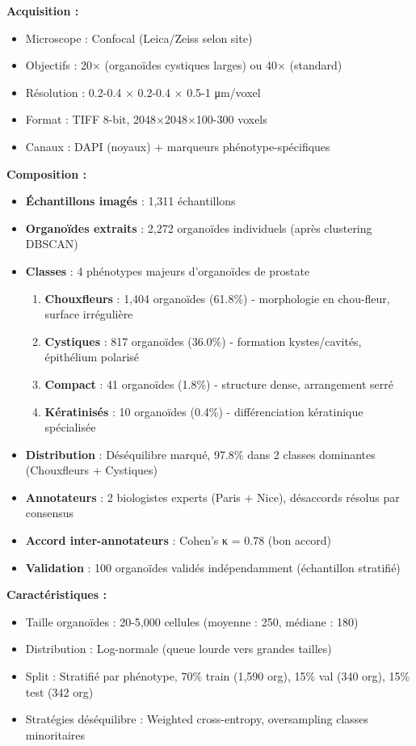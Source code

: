\textbf{Acquisition :}
\begin{itemize}
    \item Microscope : Confocal (Leica/Zeiss selon site)
    \item Objectifs : 20× (organoïdes cystiques larges) ou 40× (standard)
    \item Résolution : 0.2-0.4 × 0.2-0.4 × 0.5-1 μm/voxel
    \item Format : TIFF 8-bit, 2048×2048×100-300 voxels
    \item Canaux : DAPI (noyaux) + marqueurs phénotype-spécifiques
\end{itemize}

\textbf{Composition :}
\begin{itemize}
    \item \textbf{Échantillons imagés} : 1,311 échantillons
    \item \textbf{Organoïdes extraits} : 2,272 organoïdes individuels (après clustering DBSCAN)
    \item \textbf{Classes} : 4 phénotypes majeurs d'organoïdes de prostate
    \begin{enumerate}
        \item \textbf{Chouxfleurs} : 1,404 organoïdes (61.8\%) - morphologie en chou-fleur, surface irrégulière
        \item \textbf{Cystiques} : 817 organoïdes (36.0\%) - formation kystes/cavités, épithélium polarisé
        \item \textbf{Compact} : 41 organoïdes (1.8\%) - structure dense, arrangement serré
        \item \textbf{Kératinisés} : 10 organoïdes (0.4\%) - différenciation kératinique spécialisée
    \end{enumerate}
    \item \textbf{Distribution} : Déséquilibre marqué, 97.8\% dans 2 classes dominantes (Chouxfleurs + Cystiques)
    \item \textbf{Annotateurs} : 2 biologistes experts (Paris + Nice), désaccords résolus par consensus
    \item \textbf{Accord inter-annotateurs} : Cohen's κ = 0.78 (bon accord)
    \item \textbf{Validation} : 100 organoïdes validés indépendamment (échantillon stratifié)
\end{itemize}

\textbf{Caractéristiques :}
\begin{itemize}
    \item Taille organoïdes : 20-5,000 cellules (moyenne : 250, médiane : 180)
    \item Distribution : Log-normale (queue lourde vers grandes tailles)
    \item Split : Stratifié par phénotype, 70\% train (1,590 org), 15\% val (340 org), 15\% test (342 org)
    \item Stratégies déséquilibre : Weighted cross-entropy, oversampling classes minoritaires
\end{itemize}

